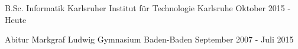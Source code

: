 


\begin{cventries}


\cventry
{B.Sc. Informatik} %
{Karlsruher Institut für Technologie} %
{Karlsruhe} %
{Oktober 2015 - Heute} %
{ %
\begin{cvitems}
\end{cvitems}
}

\cventry
{Abitur} %
{Markgraf Ludwig Gymnasium} %
{Baden-Baden} %
{September 2007 - Juli 2015} %
{ %
\begin{cvitems}
\end{cvitems}
}

\end{cventries}